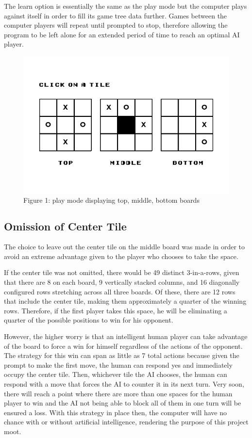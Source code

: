 \documentclass[preprint,12pt]{elsarticle}
\begin{document}
		The learn option is essentially the same as the play mode but the computer plays against itself in order to fill its game tree data further. Games between the computer players will repeat until prompted to stop, therefore allowing the program to be left alone for an extended period of time to reach an optimal AI player.

		\begin{figure}[h]
			\centering\includegraphics[width=0.5\linewidth]{1.jpg}
			\caption{Figure 1: play mode displaying top, middle, bottom boards}
		\end{figure}

	\subsection{Omission of Center Tile}
		The choice to leave out the center tile on the middle board was made in order to avoid an extreme advantage given to the player who chooses to take the space.

		If the center tile was not omitted, there would be 49 distinct 3-in-a-rows, given that there are 8 on each board, 9 vertically stacked columns, and 16 diagonally configured rows stretching across all three boards. Of these, there are 12 rows that include the center tile, making them approximately a quarter of the winning rows. Therefore, if the first player takes this space, he will be eliminating a quarter of the possible positions to win for his opponent.

		However, the higher worry is that an intelligent human player can take advantage of the board to force a win for himself regardless of the actions of the opponent. The strategy for this win can span as little as 7 total actions because given the prompt to make the first move, the human can respond yes and immediately occupy the center tile. Then, whichever tile the AI chooses, the human can respond with a move that forces the AI to counter it in its next turn. Very soon, there will reach a point where there are more than one spaces for the human player to win and the AI not being able to block all of them in one turn will be ensured a loss. With this strategy in place then, the computer will have no chance with or without artificial intelligence, rendering the purpose of this project moot.
\end{document}
